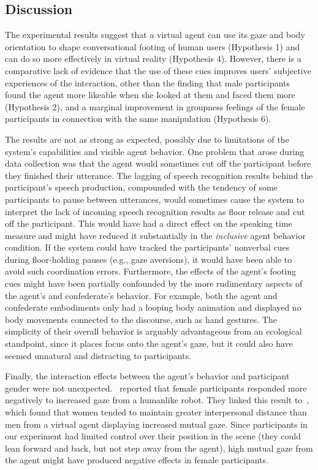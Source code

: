 \subsection{Discussion}

The experimental results suggest that a virtual agent can use its gaze and body orientation to shape conversational footing of human users (Hypothesis 1) and can do so more effectively in virtual reality (Hypothesis 4). However, there is a comparative lack of evidence that the use of these cues improves users' subjective experiences of the interaction, other than the finding that male participants found the agent more likeable when she looked at them and faced them more (Hypothesis 2), and a marginal improvement in groupness feelings of the female participants in connection with the same manipulation (Hypothesis 6).

The results are not as strong as expected, possibly due to limitations of the system's capabilities and visible agent behavior. One problem that arose during data collection was that the agent would sometimes cut off the participant before they finished their utterance. The lagging of speech recognition results behind the participant's speech production, compounded with the tendency of some participants to pause between utterances, would sometimes cause the system to interpret the lack of incoming speech recognition results as floor release and cut off the participant. This would have had a direct effect on the speaking time measure and might have reduced it substantially in the \emph{inclusive} agent behavior condition.
If the system could have tracked the participants' nonverbal cues during floor-holding pauses (e.g., gaze aversions), it would have been able to avoid such coordination errors.
Furthermore, the effects of the agent's footing cues might have been partially confounded by the more rudimentary aspects of the agent's and confederate's behavior. For example, both the agent and confederate embodiments only had a looping body animation and displayed no body movements connected to the discourse, such as hand gestures. The simplicity of their overall behavior is arguably advantageous from an ecological standpoint, since it places focus onto the agent's gaze, but it could also have seemed unnatural and distracting to participants.

Finally, the interaction effects between the agent's behavior and participant gender were not unexpected.~\citet{mutlu2006storytelling} reported that female participants responded more negatively to increased gaze from a humanlike robot. They linked this result to~\citep{bailenson2001equilibrium}, which found that women tended to maintain greater interpersonal distance than men from a virtual agent displaying increased mutual gaze. Since participants in our experiment had limited control over their position in the scene (they could lean forward and back, but not step away from the agent), high mutual gaze from the agent might have produced negative effects in female participants.
